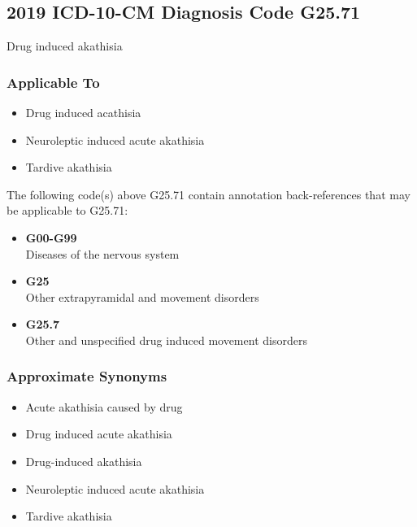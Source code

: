 \begin{paracol}{2}
\begin{leftcolumn}
\hypertarget{icd-10-cm-diagnosis-code-g25.71}{%
\subsection{2019 ICD-10-CM Diagnosis Code G25.71}\label{icd-10-cm-diagnosis-code-g25.71}}

\noindent Drug induced akathisia

\hypertarget{applicable-to-1}{%
\subsubsection{Applicable To}\label{applicable-to-1}}

\begin{itemize}
\tightlist
\item
  Drug induced acathisia
\item
  Neuroleptic induced acute akathisia
\item
  Tardive akathisia
\end{itemize}

\noindent The following code(s) above G25.71 contain annotation back-references that may be applicable to G25.71:

\begin{itemize}
\tightlist
\item
  \textbf{G00-G99}\\
  Diseases of the nervous system
\item
  \textbf{G25}\\
  Other extrapyramidal and movement disorders
\item
  \textbf{G25.7}\\
  Other and unspecified drug induced movement disorders
\end{itemize}

\hypertarget{approximate-synonyms-1}{%
\subsubsection{Approximate Synonyms}\label{approximate-synonyms-1}}

\begin{itemize}
\tightlist
\item
  Acute akathisia caused by drug
\item
  Drug induced acute akathisia
\item
  Drug-induced akathisia
\item
  Neuroleptic induced acute akathisia
\item
  Tardive akathisia
\end{itemize}


\end{leftcolumn}
\end{paracol}
